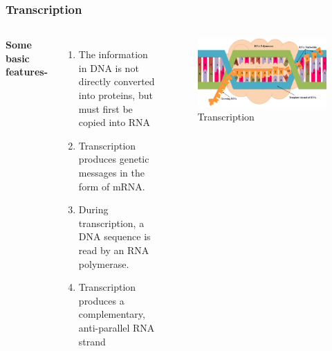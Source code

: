 \documentclass{beamer}
\begin{document}

\begin{frame}
\frametitle{Transcription}
\begin{columns}[c] %

\textbf{Some basic features-}
\begin{enumerate}
\item The information in DNA is not directly converted into proteins, but must first be copied into RNA
\item Transcription produces genetic messages in the form of mRNA.
\item During transcription, a DNA sequence is read by an RNA polymerase. 
\item Transcription produces a complementary, anti-parallel RNA strand
\end{enumerate}


\begin{figure}[!htb]
\centering
	\includegraphics[scale=.16]{diagrams/Transcription.png}
	\caption{Transcription}
	\label{fig:transcription}
\end{figure}

\end{columns}
\end{frame}

\end{document}
